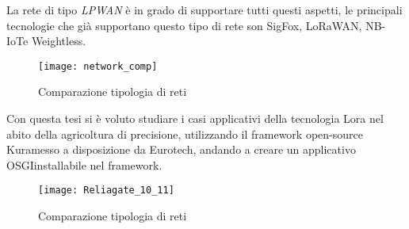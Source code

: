 La rete di tipo \emph{LPWAN} è in grado di supportare tutti questi aspetti, le
principali tecnologie che già supportano questo tipo di rete son SigFox\tm,
LoRaWAN\tm, NB-IoT\tm e Weightless\tm. 

\begin{figure}[h]
\centering 
\texttt{[image: network\_comp]}
\caption{Comparazione tipologia di reti}
\end{figure}

Con questa tesi si è voluto studiare i casi applicativi della tecnologia Lora\tm
nel abito della agricoltura di precisione, utilizzando il framework open-source
Kura\tm messo a disposizione da Eurotech\tm, andando a creare un applicativo
OSGI\reg installabile nel framework. 
\begin{figure}[h]
\centering 
\texttt{[image: Reliagate\_10\_11]}
\caption{Comparazione tipologia di reti}
\end{figure}

